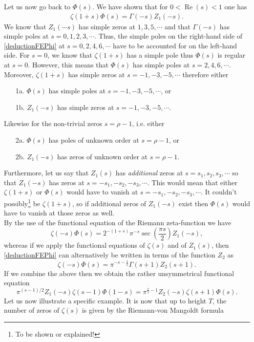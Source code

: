 \documentclass[11pt]{article}
\newcommand{\real}{\operatorname{Re}}
\numberwithin{equation}{section}		 			%
\numberwithin{figure}{section}			 			%
\begin{document}
\noindent Let us now go back to $\Phi (s)$. We have shown that for $0< \real(s) < 1$ one has
\begin{align} \label{deductionFEPhi}
\zeta (1 + s)\Phi (s) = \Gamma ( - s){Z_1}( - s).
\end{align}
We know that $Z_1(-s)$ has simple zeros at $1,3,5,\cdots$ and that $\Gamma(-s)$ has simple poles at $s=0,1,2,3,\cdots$. Thus, the simple poles on the right-hand side of \eqref{deductionFEPhi} at $s=0,2,4,6,\cdots$ have to be accounted for on the left-hand side. For $s=0$, we know that $\zeta(1+s)$ has a simple pole thus $\Phi(s)$ is regular at $s=0$. However, this means that $\Phi(s)$ has simple poles at $s=2,4,6,\cdots$. Moreover, $\zeta(1+s)$ has simple zeros at $s=-1,-3,-5,\cdots$ therefore either
\begin{enumerate}
\item[1a.] $\Phi(s)$ has simple poles at $s=-1,-3,-5,\cdots$, or
\item[1b.] $Z_1(-s)$ has simple zeros at $s=-1,-3,-5,\cdots$.
\end{enumerate}
Likewise for the non-trivial zeros $s=\rho-1$, i.e. either
\begin{enumerate}
\item[2a.] $\Phi(s)$ has poles of unknown order at $s=\rho-1$, or
\item[2b.] $Z_1(-s)$ has zeros of unknown order at $s=\rho-1$.
\end{enumerate}
Furthermore, let us say that $Z_1(s)$ has \textit{additional} zeros at $s=s_1,s_2,s_3,\cdots$ so that $Z_1(-s)$ has zeros at $s=-s_1,-s_2,-s_3,\cdots$. This would mean that either $\zeta(1+s)$ or $\Phi(s)$ would have to vanish at $s=-s_1,-s_2,-s_3,\cdots$. It couldn't possibly\footnote{To be shown or explained!} be $\zeta(1+s)$, so if additional zeros of $Z_1(-s)$ exist then $\Phi(s)$ would have to vanish at those zeros as well.\\
By the use of the functional equation of the Riemann zeta-function we have
\[\zeta ( - s)\Phi (s) = {2^{ - (1 + s)}}{\pi ^{ - s}}\sec \left( {\frac{{\pi s}}{2}} \right){Z_1}( - s),\]
whereas if we apply the functional equations of $\zeta(s)$ and of $Z_1(s)$, then \eqref{deductionFEPhi} can alternatively be written in terms of the function $Z_2$ as
\[\zeta ( - s)\Phi (s) = {\pi ^{ - s - \tfrac{1}{2}}}\Gamma (s + 1){Z_2}(s + 1).\]
If we combine the above then we obtain the rather unsymmetrical functional equation
\[{\pi ^{(s - 1)/2}}{Z_1}( - s)\zeta (s - 1)\Phi (1 - s) = {\pi ^{\tfrac{s}{2} - 1}}{Z_2}( - s)\zeta (s + 1)\Phi (s).\]
Let us now illustrate a specific example. It is now that up to height $T$, the number of zeros of $\zeta(s)$ is given by the Riemann-von Mangoldt formula
\end{document}
